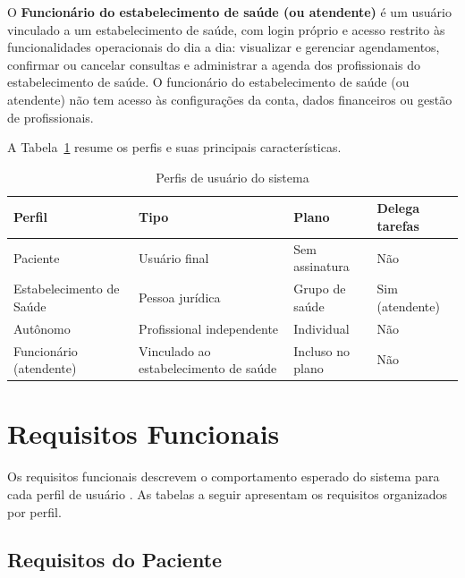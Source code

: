 O \textbf{Funcionário do estabelecimento de saúde (ou atendente)} é
um usuário vinculado a um estabelecimento de saúde, com login próprio
e acesso restrito às funcionalidades operacionais do
dia a dia: visualizar e gerenciar agendamentos,
confirmar ou cancelar consultas e administrar a agenda
dos profissionais do estabelecimento de saúde. O funcionário do estabelecimento de saúde
(ou atendente) não tem acesso às configurações da
conta, dados financeiros ou gestão de profissionais.

A Tabela~\ref{tab:profiles} resume os perfis e suas
principais características.

\begin{table}[H]
  \centering
  \caption{Perfis de usuário do sistema}
  \label{tab:profiles}
  \begin{tabular}{p{2.8cm}p{3cm}p{3cm}p{2.8cm}}
    \toprule
    \textbf{Perfil} &
    \textbf{Tipo} &
    \textbf{Plano} &
    \textbf{Delega tarefas} \\
    \midrule
    Paciente
      & Usuário final
      & Sem assinatura
      & Não \\
    Estabelecimento de Saúde
      & Pessoa jurídica
      & Grupo de saúde
      & Sim (atendente) \\
    Autônomo
      & Profissional independente
      & Individual
      & Não \\
    Funcionário (atendente)
      & Vinculado ao estabelecimento de saúde
      & Incluso no plano
      & Não \\
    \bottomrule
  \end{tabular}
\end{table}

\section{Requisitos Funcionais}
\label{sec:functional-requirements}

Os requisitos funcionais descrevem o comportamento
esperado do sistema para cada perfil de usuário
\cite{sommerville2011}. As tabelas a seguir
apresentam os requisitos organizados por perfil.

\subsection{Requisitos do Paciente}
\label{subsec:patient-requirements}

